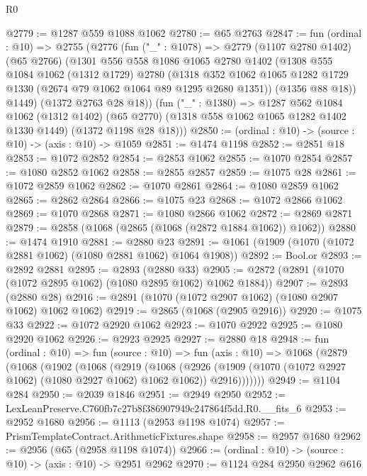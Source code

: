 \begin{lexlean}{R0}
\begin{coremodule}
@2779 := @1287 @559 @1088 @1062
@2780 := @65 @2763
@2847 := fun (ordinal : @10) =>
  @2755
    (@2776
      (fun ("_" : @1078) =>
      @2779
        (@1107 @2780 @1402)
        (@65 @2766)
        (@1301
          @556
          @558
          @1086
          @1065
          @2780
          @1402
          (@1308
            @555
            @1084
            @1062
            (@1312 @1729)
            @2780
            (@1318 @352 @1062 @1065 @1282 @1729 @1330 (@2674 @79 @1062 @1064 @89 @1295 @2680 @1351))
            (@1356 @88 @18))
          @1449)
        (@1372 @2763 @28 @18))
      (fun ("_" : @1380) =>
      @1287
        @562
        @1084
        @1062
        (@1312 @1402)
        (@65 @2770)
        (@1318 @558 @1062 @1065 @1282 @1402 @1330 @1449)
        (@1372 @1198 @28 @18)))
@2850 := (ordinal : @10) -> (source : @10) -> (axis : @10) -> @1059
@2851 := @1474 @1198
@2852 := @2851 @18
@2853 := @1072 @2852
@2854 := @2853 @1062
@2855 := @1070 @2854
@2857 := @1080 @2852 @1062
@2858 := @2855 @2857
@2859 := @1075 @28
@2861 := @1072 @2859 @1062
@2862 := @1070 @2861
@2864 := @1080 @2859 @1062
@2865 := @2862 @2864
@2866 := @1075 @23
@2868 := @1072 @2866 @1062
@2869 := @1070 @2868
@2871 := @1080 @2866 @1062
@2872 := @2869 @2871
@2879 := @2858 (@1068 (@2865 (@1068 (@2872 @1884 @1062)) @1062))
@2880 := @1474 @1910
@2881 := @2880 @23
@2891 := @1061 (@1909 (@1070 (@1072 @2881 @1062) (@1080 @2881 @1062) @1064 @1908))
@2892 := Bool.or
@2893 := @2892 @2881
@2895 := @2893 (@2880 @33)
@2905 := @2872 (@2891 (@1070 (@1072 @2895 @1062) (@1080 @2895 @1062) @1062 @1884))
@2907 := @2893 (@2880 @28)
@2916 := @2891 (@1070 (@1072 @2907 @1062) (@1080 @2907 @1062) @1062 @1062)
@2919 := @2865 (@1068 (@2905 @2916))
@2920 := @1075 @33
@2922 := @1072 @2920 @1062
@2923 := @1070 @2922
@2925 := @1080 @2920 @1062
@2926 := @2923 @2925
@2927 := @2880 @18
@2948 := fun (ordinal : @10) =>
  fun (source : @10) =>
  fun (axis : @10) =>
  @1068
    (@2879
      (@1068
        (@1902
          (@1068
            (@2919
              (@1068
                (@2926
                  (@1909 (@1070 (@1072 @2927 @1062) (@1080 @2927 @1062) @1062 @1062))
                  @2916)))))))
@2949 := @1104 @284
@2950 := @2039 @1846
@2951 := @2949 @2950
@2952 := LexLeanPreserve.C760fb7c27b8f386907949c247864f5dd.R0.__fits_6
@2953 := @2952 @1680
@2956 := @1113 (@2953 @1198 @1074)
@2957 := PrismTemplateContract.ArithmeticFixtures.shape
@2958 := @2957 @1680
@2962 := @2956 (@65 (@2958 @1198 @1074))
@2966 := (ordinal : @10) -> (source : @10) -> (axis : @10) -> @2951 @2962
@2970 := @1124 @284 @2950 @2962 @616

\end{coremodule}
\end{lexlean}
